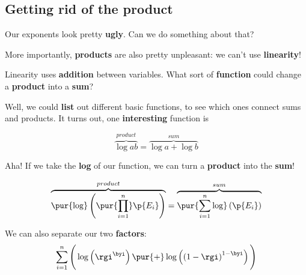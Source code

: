     \subsection*{Getting rid of the product}
    
        Our exponents look pretty \textbf{ugly}. Can we do something about that?
        
        More importantly, \textbf{products} are also pretty unpleasant: we can't use \textbf{linearity}! 
        
        Linearity uses \textbf{addition} between variables. What sort of \textbf{function} could change a \textbf{product} into a \textbf{sum}?
        
        Well, we could \textbf{list} out different basic functions, to see which ones connect sums and products. It turns out, one \textbf{interesting} function is
        
        \begin{equation}
            \overbrace{
                \log{ab}}
            ^{product}
            =
            \overbrace{
                \log{a} + \log{b}
            }^{sum}
        \end{equation}
        
        Aha! If we take the \textbf{log} of our function, we can turn a \textbf{product} into the \textbf{sum}!

        \begin{equation}
            \overbrace{
                \pur{\log}
                \left(
                    \pur{\prod_{i = 1}^n}
                    \p{E_i}
                \right)
            }^{product}
            =
            \overbrace{
                \pur{\sum_{i = 1}^n
                \log}
                \left(
                    \p{E_i}
                \right)
            }^{sum}
        \end{equation}
        
        We can also separate our two \textbf{factors}:
        \begin{equation}
            \sum_{i = 1}^n
            \Bigg(
                \log\left(
                        \rgi ^{\byi}
                \right)
                \pur{+}
                \log\left( 
                    \left(  1 - \rgi  \right)
                    ^ { 1 - \byi }
                \right) 
            \Bigg)
        \end{equation}
        

